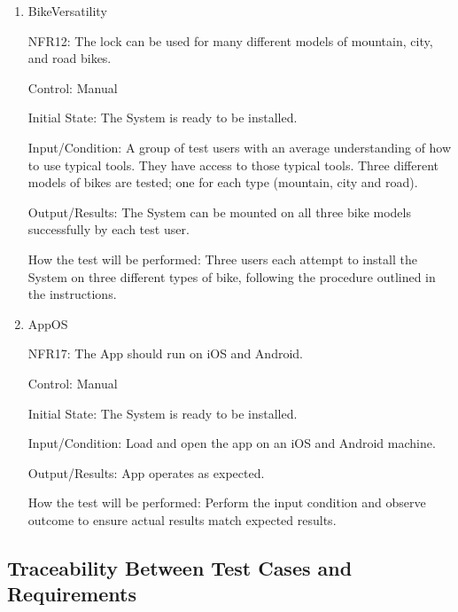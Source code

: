 \documentclass[12pt, titlepage]{article}
\begin{document}
\begin{enumerate}
\item{BikeVersatility

NFR12: The lock can be used for many different models of mountain, city, and road bikes.  }

Control: Manual 

Initial State: The System is ready to be installed. 

Input/Condition: A group of test users with an average understanding of how to use typical tools. They have access to those typical tools. Three different models of bikes are tested; one for each type (mountain, city and road). 

Output/Results: The System can be mounted on all three bike models successfully by each test user. 

How the test will be performed: Three users each attempt to install the System on three different types of bike, following the procedure outlined in the instructions.  

\item{AppOS

NFR17: The App should run on iOS and Android.  }

Control: Manual 

Initial State: The System is ready to be installed. 

Input/Condition: Load and open the app on an iOS and Android machine.

Output/Results: App operates as expected.

How the test will be performed: Perform the input condition and observe outcome to ensure actual results match expected results.  
\end{enumerate}

\subsection{Traceability Between Test Cases and Requirements}
\end{document}
